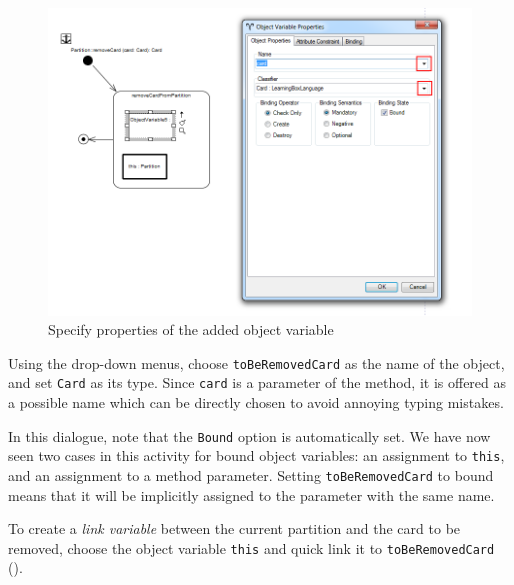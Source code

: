 \begin{stepbystep}
\newpage

\vspace{0.5cm}

\begin{figure}[htp]
\begin{center}
  \includegraphics[width=\textwidth]{../../org.moflon.doc.handbook.03_storyDiagrams/03_removeCard/visRemImages/ea_sdmPropertiesObjVar}
  \caption{Specify properties of the added object variable}  
  \label{ea:object_variable_properties}
\end{center}
\end{figure}


\item Using the drop-down menus, choose \texttt{toBeRemovedCard} as the name of the object, and set \texttt{Card} as its type.
Since \texttt{card} is a parameter of the method, it is offered as a possible name which can be directly chosen to avoid annoying typing mistakes.

\item In this dialogue, note that the \texttt{Bound} option is automatically set. We have now seen two cases in this activity for bound
object variables: an assignment to \texttt{this}, and an assignment to a method parameter. Setting \texttt{toBeRemovedCard} to bound means that it will be implicitly
assigned to the parameter with the same name.

\item To create a \emph{link variable} between the current partition and the card to be removed, choose the object variable \texttt{this}
and quick link it to \texttt{toBeRemovedCard} ().


\end{stepbystep}
